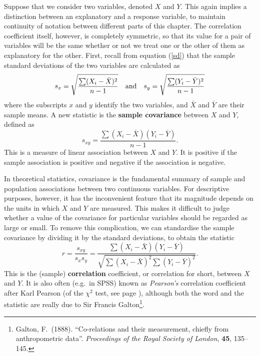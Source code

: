 Suppose that we consider two variables, denoted $X$ and $Y$. This again
implies a distinction between an explanatory and a response variable, to
maintain continuity of notation between different parts of this chapter.
The correlation coefficient itself, however, is completely symmetric, so
that its value for a pair of variables will be the same whether or not
we treat one or the other of them as explanatory for the other.
First, recall from equation (\ref{sd}) that the sample standard
deviations of the two variables are calculated as
\begin{equation}
s_{x} = \sqrt{\frac{\sum(X_{i}-\bar{X})^{2}}{n-1}}
\hspace*{1em}\text{and}\hspace*{1em}
s_{y} = \sqrt{\frac{\sum (Y_{i}-\bar{Y})^{2}}{n-1}}
\label{sdyx}
\end{equation}
where the subscripts $x$ and $y$ identify the two variables, and
$\bar{X}$ and $\bar{Y}$ are their sample means. A new statistic
is the
\textbf{sample covariance} between $X$ and $Y$, defined as
\begin{equation}
s_{xy} = \frac{\sum (X_{i}-\bar{X})(Y_{i}-\bar{Y})}{n-1}.
\label{sxy}
\end{equation}
This is a measure of linear association between $X$ and $Y$. It is
positive if the sample association is positive and negative if the
association is negative.

In theoretical statistics, covariance is the fundamental summary of
sample and population associations between two continuous variables. For
descriptive purposes, however, it has the inconvenient feature that its
magnitude depends on the units in which $X$ and $Y$ are measured. This
makes it difficult to judge whether a value of the covariance
for particular variables should be regarded as large or small. To remove
this complication, we can standardise the sample covariance by dividing
it by the standard deviations, to obtain the statistic
\begin{equation}
r=\frac{s_{xy}}{s_{x}s_{y}} =
\frac
{
\sum (X_{i}-\bar{X})(Y_{i}-\bar{Y})
}{
\sqrt{
\sum\left(X_{i}-\bar{X}\right)^{2}
\sum\left(Y_{i}-\bar{Y}\right)^{2}}
}.
\label{corr}
\end{equation}
This is the (sample) \textbf{correlation} coefficient, or correlation
for short, between $X$ and $Y$. It is also often (e.g.\ in SPSS) known as
\emph{Pearson's} correlation coefficient after Karl Pearson (of the
$\chi^{2}$ test, see page \pageref{p_pearson}), although both the word and the statistic
are really due to Sir Francis Galton\footnote{ Galton, F.\ (1888).
``Co-relations and their measurement, chiefly from anthropometric
data''. \emph{Proceedings of the Royal Society of London}, \textbf{45},
135--145.}.

